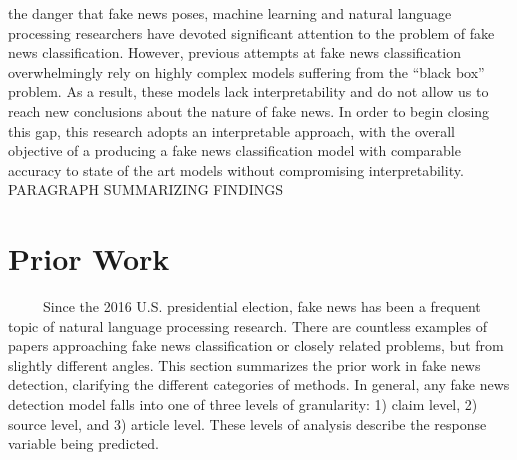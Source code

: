 \documentclass[12pt]{article}
\begin{document}
the danger that fake news poses, machine learning and natural language
processing researchers have devoted significant attention to the problem
of fake news classification. However, previous attempts at fake news
classification overwhelmingly rely on highly complex models suffering
from the ``black box'' problem. As a result, these models lack
interpretability and do not allow us to reach new conclusions about the
nature of fake news. In order to begin closing this gap, this research
adopts an interpretable approach, with the overall objective of a
producing a fake news classification model with comparable accuracy to
state of the art models without compromising interpretability.\\
\hspace*{0.333em}\hspace*{0.333em}\hspace*{0.333em}\hspace*{0.333em}\hspace*{0.333em}PARAGRAPH
SUMMARIZING FINDINGS

\section{Prior Work}
\label{sec:verify}

~~~~~Since the 2016 U.S. presidential election, fake news has been a
frequent topic of natural language processing research. There are
countless examples of papers approaching fake news classification or
closely related problems, but from slightly different angles. This
section summarizes the prior work in fake news detection, clarifying the
different categories of methods. In general, any fake news detection
model falls into one of three levels of granularity: 1) claim level, 2)
source level, and 3) article level. These levels of analysis describe
the response variable being predicted.
\end{document}
